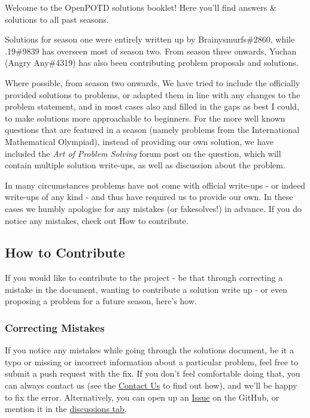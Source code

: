 Welcome to the OpenPOTD solutions booklet! Here you'll find answers \& solutions to all past seasons.\medskip

Solutions for season one were entirely written up by {\selectfont Brainysmurfs\#2860}, while {\selectfont .19\#9839} has overseen most of season two. 
From season three onwards, Yuchan ({\selectfont Angry Any\#4319}) has also been contributing problem proposals and solutions. 

Where possible, from season two onwards, We have tried to include the officially provided solutions to problems, 
or adapted them in line with any changes to the problem statement, and in most cases also and filled in the gaps as best I could, 
to make solutions more approachable to beginners. 
For the more well known questions that are featured in a season (namely problems from the International Mathematical Olympiad), 
instead of providing our own solution, we have included the \emph{Art of Problem Solving} forum post on the question, 
which will contain multiple solution write-ups, as well as discussion about the problem.

In many circumstances problems have not come with official write-ups - or indeed write-ups of any kind - 
and thus have required us to provide our own. In these cases we humbly apologise for any mistakes (or fakesolves!) in advance. 
If you do notice any mistakes, check out How to contribute.\medskip

\subsection*{How to Contribute}
\label{sec:contribute}

If you would like to contribute to the project - be that through correcting a mistake in the document, 
wanting to contribute a solution write up - or even proposing a problem for a future season, here's how.\medskip

\subsubsection*{Correcting Mistakes}
\label{sec:mistakes}

If you notice any mistakes while going through the solutions document, be it a typo or missing or incorrect information about a particular problem, feel free to submit a push request with the fix. 
If you don't feel comfortable doing that, you can always contact us (see the \hyperref[sec:contact]{Contact Us} to find out how), 
and we'll be happy to fix the error. Alternatively, you can open up an \href{https://github.com/OpenPOTD/Solutions/issues}{Issue} on the GitHub, or mention it in the \href{https://github.com/OpenPOTD/Solutions/discussions}{discussions tab}.\medskip

